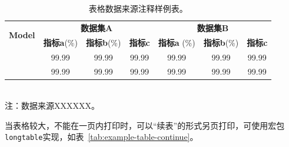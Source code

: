 \begin{table}[htbp]
   \centering
   \caption[数据来源注释表]{表格数据来源注释样例表。}
   \label{tab:example-table-source-foot}
   \begin{minipage}[t]{0.9\textwidth}
   \begin{small}
   \begin{tabular}{@{}l|ccc|ccc@{}}
   \toprule
   \multirow{2}{*}{\textbf{Model}} & \multicolumn{3}{c|}{\textbf{数据集A}} & \multicolumn{3}{c}{\textbf{数据集B}} \\ \cmidrule(l){2-7} 
    & \textbf{指标a}(\%) & \textbf{指标b}(\%) & \textbf{指标c} & \textbf{指标a} (\%) & \textbf{指标b}(\%) & \textbf{指标c} \\ \midrule
      \citet{devlin2018bert}      &99.99  & 99.99  & 99.99  &99.99  & 99.99  & 99.99  \\
      \citet{yang2019xlnet}      &99.99  & 99.99  & 99.99  &99.99  & 99.99  & 99.99  \\
    \bottomrule
   \end{tabular}\\[6pt]
   \footnotesize 注：数据来源XXXXXX。\\
   \end{small}
   \end{minipage}
\end{table}

当表格较大，不能在一页内打印时，可以“续表”的形式另页打印，可使用宏包\verb|longtable|实现，如表~\ref{tab:example-table-continue}。

